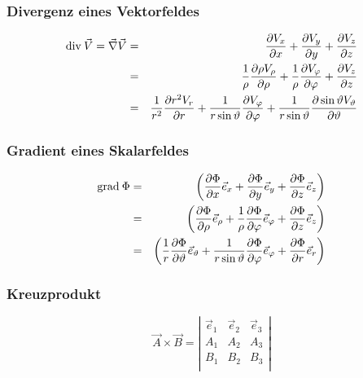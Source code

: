 \subsubsection{Divergenz eines Vektorfeldes}
\begin{eqnarray*}
  {\rm div \:}\vec{V}=\vec{\nabla}\vec{V}&=&\frac{\partial V_x}{\partial x}+
  \frac{\partial V_y}{\partial y}+\frac{\partial V_z}{\partial z}\\
  &=&\frac{1}{\rho}
  \frac{\partial \rho V_{\rho}}{\partial\rho}+\frac{1}{\rho}
  \frac{\partial V_{\varphi}}{\partial \varphi}+
  \frac{\partial V_z}{\partial z}\\
  &=&\frac{1}{r^2}\frac{\partial r^2 V_r}{\partial r}
  +\frac{1}{r\sin\vartheta}\frac{\partial V_{\varphi}}{\partial \varphi}
  +\frac{1}{r\sin\vartheta}\frac{\partial \sin\vartheta V_{\vartheta}}{\partial
  \vartheta}
\end{eqnarray*}

\subsubsection{Gradient eines Skalarfeldes}
\begin{eqnarray*}
  {\rm grad \:}\Phi&=&\left(\frac{\partial \Phi}{\partial x}\vec{e}_x+
  \frac{\partial \Phi}{\partial y}\vec{e}_y+\frac{\partial \Phi}{\partial
  z}\vec{e}_z\right)\\&=&
  \left(\frac{\partial \Phi}{\partial \rho}\vec{e}_{\rho}+
  \frac{1}{\rho}\frac{\partial \Phi}{\partial \varphi}\vec{e}_{\varphi}
  +\frac{\partial \Phi}{\partial z}\vec{e}_z\right)\\&=&
  \left(\frac{1}{r}\frac{\partial \Phi}{\partial \vartheta}\vec{e}_{\vartheta}+
  \frac{1}{r\sin\vartheta}\frac{\partial \Phi}{\partial \varphi}\vec{e}_
  {\varphi}+\frac{\partial \Phi}{\partial r}\vec{e}_r\right)
\end{eqnarray*}

\subsubsection{Kreuzprodukt}
$$\vec{A}\times\vec{B}=\left|\begin{array}{ccc}\vec{e}_1&\vec{e}_2&\vec{e}_3\\
  A_1&A_2&A_3\\B_1&B_2&B_3\\ \end{array} \right|$$

